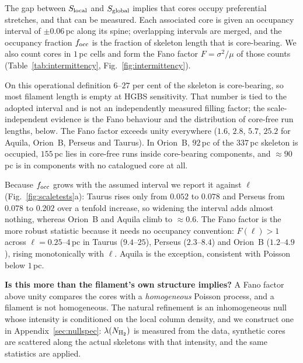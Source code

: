 \documentclass[usenatbib,twoside,twocolumn]{mnras}
\begin{document}
The gap between $S_{\rm local}$ and $S_{\rm global}$ implies that cores occupy preferential stretches, and that can be measured. Each associated core is given an occupancy interval of $\pm0.06$\,pc along its spine; overlapping intervals are merged, and the occupancy fraction $f_{\rm occ}$ is the fraction of skeleton length that is core-bearing. We also count cores in $1$\,pc cells and form the Fano factor $F=\sigma^2/\mu$ of those counts (Table~\ref{tab:intermittency}, Fig.~\ref{fig:intermittency}).

On this operational definition $6$--$27$ per cent of the skeleton is core-bearing, so most filament length is empty at HGBS sensitivity. That number is tied to the adopted interval and is not an independently measured filling factor; the scale-independent evidence is the Fano behaviour and the distribution of core-free run lengths, below. The Fano factor exceeds unity everywhere ($1.6$, $2.8$, $5.7$, $25.2$ for Aquila, Orion~B, Perseus and Taurus). In Orion~B, $92$\,pc of the $337$\,pc skeleton is occupied, $155$\,pc lies in core-free runs inside core-bearing components, and $\approx90$\,pc is in components with no catalogued core at all.

Because $f_{\rm occ}$ grows with the assumed interval we report it against $\ell$ (Fig.~\ref{fig:scaletests}a): Taurus rises only from $0.052$ to $0.078$ and Perseus from $0.078$ to $0.202$ over a tenfold increase, so widening the interval adds almost nothing, whereas Orion~B and Aquila climb to $\approx0.6$. The Fano factor is the more robust statistic because it needs no occupancy convention: $F(\ell)>1$ across $\ell=0.25$--$4$\,pc in Taurus ($9.4$--$25$), Perseus ($2.3$--$8.4$) and Orion~B ($1.2$--$4.9$), rising monotonically with $\ell$. Aquila is the exception, consistent with Poisson below $1$\,pc.

\smallskip\noindent\textbf{Is this more than the filament's own structure implies?} A Fano factor above unity compares the cores with a \emph{homogeneous} Poisson process, and a filament is not homogeneous. The natural refinement is an inhomogeneous null whose intensity is conditioned on the local column density, and we construct one in Appendix~\ref{sec:nullspec}: $\lambda(N_{\rm H_2})$ is measured from the data, synthetic cores are scattered along the actual skeletons with that intensity, and the same statistics are applied.
\end{document}
